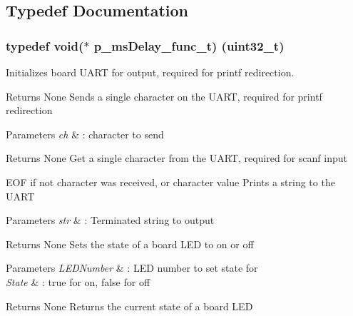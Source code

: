 \subsection{Typedef Documentation}
\subsubsection[{\texorpdfstring{p\+\_\+ms\+Delay\+\_\+func\+\_\+t}{p_msDelay_func_t}}]{\setlength{\rightskip}{0pt plus 5cm}typedef void($\ast$ p\+\_\+ms\+Delay\+\_\+func\+\_\+t) (uint32\+\_\+t)}\hypertarget{group__BOARD__COMMON__API_gae997487a4f312eb187c5e0201a7f1d5f}{}\label{group__BOARD__COMMON__API_gae997487a4f312eb187c5e0201a7f1d5f}


Initializes board U\+A\+RT for output, required for printf redirection. 

\begin{DoxyReturn}{Returns}
None Sends a single character on the U\+A\+RT, required for printf redirection 
\end{DoxyReturn}

\begin{DoxyParams}{Parameters}
{\em ch} & \+: character to send \\
\hline
\end{DoxyParams}
\begin{DoxyReturn}{Returns}
None Get a single character from the U\+A\+RT, required for scanf input 

E\+OF if not character was received, or character value Prints a string to the U\+A\+RT 
\end{DoxyReturn}

\begin{DoxyParams}{Parameters}
{\em str} & \+: Terminated string to output \\
\hline
\end{DoxyParams}
\begin{DoxyReturn}{Returns}
None Sets the state of a board L\+ED to on or off 
\end{DoxyReturn}

\begin{DoxyParams}{Parameters}
{\em L\+E\+D\+Number} & \+: L\+ED number to set state for \\
\hline
{\em State} & \+: true for on, false for off \\
\hline
\end{DoxyParams}
\begin{DoxyReturn}{Returns}
None Returns the current state of a board L\+ED 
\end{DoxyReturn}

